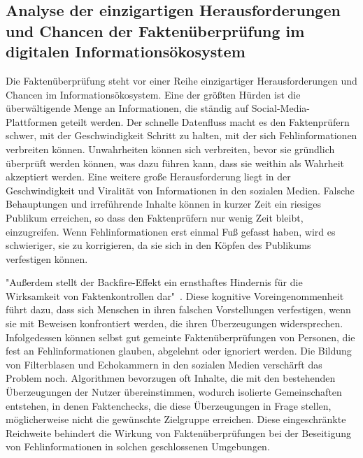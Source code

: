 \documentclass[a4paper,listof=totoc,bibliography=totoc]{scrartcl}
\begin{document}
\subsection{Analyse der einzigartigen Herausforderungen und Chancen der Faktenüberprüfung im digitalen Informationsökosystem}

Die Faktenüberprüfung steht vor einer Reihe einzigartiger Herausforderungen und Chancen im Informationsökosystem. Eine der größten Hürden ist die überwältigende Menge 
an Informationen, die ständig auf Social-Media-Plattformen geteilt werden. Der schnelle Datenfluss macht es den Faktenprüfern schwer, mit der Geschwindigkeit Schritt 
zu halten, mit der sich Fehlinformationen verbreiten können. Unwahrheiten können sich verbreiten, bevor sie gründlich überprüft werden können, was dazu führen kann, 
dass sie weithin als Wahrheit akzeptiert werden. Eine weitere große Herausforderung liegt in der Geschwindigkeit und Viralität von Informationen in den sozialen Medien. 
Falsche Behauptungen und irreführende Inhalte können in kurzer Zeit ein riesiges Publikum erreichen, so dass den Faktenprüfern nur wenig Zeit bleibt, einzugreifen. Wenn 
Fehlinformationen erst einmal Fuß gefasst haben, wird es schwieriger, sie zu korrigieren, da sie sich in den Köpfen des Publikums verfestigen können.\newline

"Außerdem stellt der Backfire-Effekt ein ernsthaftes Hindernis für die Wirksamkeit von Faktenkontrollen dar"~\cite{nyhan2010}. Diese kognitive Voreingenommenheit führt dazu, dass sich 
Menschen in ihren falschen Vorstellungen verfestigen, wenn sie mit Beweisen konfrontiert werden, die ihren Überzeugungen widersprechen. Infolgedessen können selbst gut 
gemeinte Faktenüberprüfungen von Personen, die fest an Fehlinformationen glauben, abgelehnt oder ignoriert werden. Die Bildung von Filterblasen und Echokammern in den 
sozialen Medien verschärft das Problem noch. Algorithmen bevorzugen oft Inhalte, die mit den bestehenden Überzeugungen der Nutzer übereinstimmen, wodurch isolierte Gemeinschaften 
entstehen, in denen Faktenchecks, die diese Überzeugungen in Frage stellen, möglicherweise nicht die gewünschte Zielgruppe erreichen. Diese eingeschränkte Reichweite behindert die 
Wirkung von Faktenüberprüfungen bei der Beseitigung von Fehlinformationen in solchen geschlossenen Umgebungen.\newline
\end{document}
